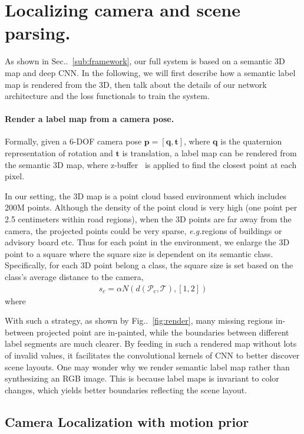 \documentclass[10pt,twocolumn,letterpaper]{article}
\makeatletter
\newcommand{\figref}[1]{Fig\onedot~\ref{#1}}
\newcommand{\secref}[1]{Sec\onedot~\ref{#1}}
\newcommand{\ve}[1]{{\mathbf #1}} %
\newcommand{\hua}[1]{{\mathcal #1}}
\DeclareRobustCommand\onedot{\futurelet\@let@token\@onedot}
\def\onedot{\ifx\@let@token.\else.\null\fi\xspace}
\def\eg{\emph{e.g.}}
\makeatother
\begin{document}
\section{Localizing camera and scene parsing.}
\label{sec:localize_and_parsing}
As shown in \secref{sub:framework}, our full system is based on a semantic 3D map and deep CNN. In the following, we will first describe how a semantic label map is rendered from the 3D, then talk about the details of our network architecture and the loss functionals to train the system.

\paragraph{Render a label map from a camera pose.} 
Formally, given a 6-DOF camera pose $\ve{p} = [\ve{q}, \ve{t}]$, where $\ve{q}$ is the quaternion representation of rotation and $\ve{t}$ is translation, a label map can be rendered from the semantic 3D map, where z-buffer~\cite{} is applied to find the closest point at each pixel.

In our setting, the 3D map is a point cloud based environment which includes 200M points. Although the density of the point cloud is very high (one point per 2.5 centimeters within road regions), when the 3D points are far away from the camera, the projected points could be very sparse, \eg regions of buildings or advisory board etc.
Thus for each point in the environment, we enlarge the 3D point to a square where the square size is dependent on its semantic class. Specifically, for each 3D point belong a class, the square size is set based on the class's average distance to the camera, 
\begin{align}
\label{eq:label}
s_c = \alpha N(d(\hua{P}_c, \hua{T}), [1, 2])
\end{align}
where

With such a strategy, as shown by \figref{fig:render}, many missing regions in-between projected point are in-painted, while the boundaries between different label segments are much clearer. By feeding in such a rendered map without lots of invalid values, it facilitates the convolutional kernels of CNN to better discover scene layouts.
One may wonder why we render semantic label map rather than synthesizing an RGB image. This is because label maps is invariant to color changes, which yields better boundaries reflecting the scene layout.

\subsection{Camera Localization with motion prior}
\end{document}
